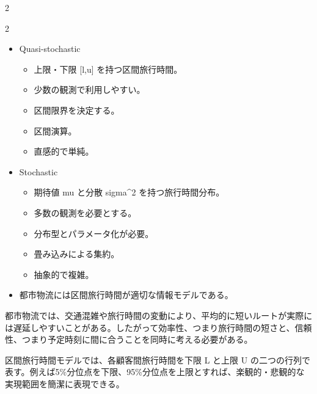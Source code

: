 \begin{multicols}{2}
\end{multicols}

\clearpage



\vspace{1.5mm}

\begin{multicols}{2}

\footnotesize

\raggedcolumns


\begin{itemize}
\item Quasi-stochastic
\begin{itemize}
\item 上限・下限 [l,u] を持つ区間旅行時間。
\item 少数の観測で利用しやすい。
\item 区間限界を決定する。
\item 区間演算。
\item 直感的で単純。
\end{itemize}
\item Stochastic
\begin{itemize}
\item 期待値 mu と分散 sigma\textasciicircum{}2 を持つ旅行時間分布。
\item 多数の観測を必要とする。
\item 分布型とパラメータ化が必要。
\item 畳み込みによる集約。
\item 抽象的で複雑。
\end{itemize}
\item 都市物流には区間旅行時間が適切な情報モデルである。
\end{itemize}

都市物流では、交通混雑や旅行時間の変動により、平均的に短いルートが実際には遅延しやすいことがある。したがって効率性、つまり旅行時間の短さと、信頼性、つまり予定時刻に間に合うことを同時に考える必要がある。\par

区間旅行時間モデルでは、各顧客間旅行時間を下限 L と上限 U の二つの行列で表す。例えば5\%分位点を下限、95\%分位点を上限とすれば、楽観的・悲観的な実現範囲を簡潔に表現できる。\par


\end{multicols}
